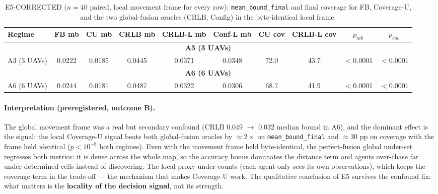 \documentclass[journal]{IEEEtran}
\newcommand{\CU}{Coverage-U}
\begin{document}
\begin{table}[t]
\caption{E5-CORRECTED ($n = 40$ paired, local movement frame for every row): \texttt{mean\_bound\_final} and final coverage for FB, \CU, and the two global-fusion oracles (CRLB, Config) in the byte-identical local frame.}
\label{tab:e5corr}
\centering
\begin{tabular}{l c c c c c c c c c}
\toprule
Regime & FB mb & CU mb & CRLB mb & CRLB-L mb & Conf-L mb & CU cov & CRLB-L cov & $p_{mb}$ & $p_{cov}$ \\
\midrule
\multicolumn{10}{c}{\textbf{A3 (3 UAVs)}} \\
\midrule
A3 (3 UAVs) & 0.0222 & 0.0185 & 0.0445 & 0.0371 & 0.0348 & 72.0 & 43.7 & $<$0.0001 & $<$0.0001 \\
\multicolumn{10}{c}{\textbf{A6 (6 UAVs)}} \\
\midrule
A6 (6 UAVs) & 0.0244 & 0.0181 & 0.0487 & 0.0322 & 0.0306 & 68.7 & 41.9 & $<$0.0001 & $<$0.0001 \\
\bottomrule
\end{tabular}
\end{table}


\paragraph{Interpretation (preregistered, outcome B).}
The global movement frame was a real but secondary confound (CRLB
0.049 $\rightarrow$ 0.032 median bound in A6), and the dominant effect is the
signal: the local \CU{} signal beats both global-fusion oracles by $\approx 2\times$
on \texttt{mean\_bound\_final} and $\approx$30 pp on coverage with the frame
held identical ($p < 10^{-8}$ both regimes). Even with the movement frame held
byte-identical, the perfect-fusion global under-set regresses both metrics: it
is dense across the whole map, so the accuracy bonus dominates the distance
term and agents over-chase far under-determined cells instead of discovering.
The local proxy under-counts (each agent only sees its own observations),
which keeps the coverage term in the trade-off --- the mechanism that makes
\CU{} work. The qualitative conclusion of E5 survives the confound fix: what
matters is the \textbf{locality of the decision signal}, not its strength.
\end{document}
